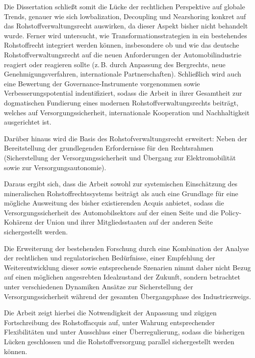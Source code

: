 \documentclass[12pt,a4paper,oneside]{book} %
\begin{document}
Die Dissertation schließt somit die Lücke der rechtlichen Perspektive auf globale Trends, genauer wie sich lowbalization, Decoupling und Nearshoring konkret auf das Rohstoffverwaltungsrecht auswirken, da dieser Aspekt bisher nicht behandelt wurde. Ferner wird untersucht, wie Transformationsstrategien in ein bestehendes Rohstoffrecht integriert werden können, insbesondere ob und wie das deutsche Rohstoffverwaltungsrecht auf die neuen Anforderungen der Automobilindustrie reagiert oder reagieren sollte (z. B. durch Anpassung des Bergrechts, neue Genehmigungsverfahren, internationale Partnerschaften). Schließlich wird auch eine Bewertung der Governance-Instrumente vorgenommen sowie Verbesserungspotential indentifiziert, sodass die Arbeit in ihrer Gesamtheit zur dogmatischen Fundierung eines modernen Rohstoffverwaltungsrechts beiträgt, welches auf Versorgungssicherheit, internationale Kooperation und Nachhaltigkeit ausgerichtet ist.

Darüber hinaus wird die Basis des Rohstofverwaltungsrecht erweitert: Neben der Bereitstellung der grundlegenden Erfordernisse für den Rechtsrahmen (Sicherstellung der Versorgungssicherheit und Übergang zur Elektromobilität sowie zur Versorgungsautonomie).

Daraus ergibt sich, dass die Arbeit sowohl zur systemischen Einschätzung des mineralischen Rohstoffrechtssystems beiträgt als auch eine Grundlage für eine mögliche Ausweitung des bisher existierenden Acquis anbietet, sodass die Versorgungssicherheit des Automobilsektors auf der einen Seite und die Policy-Kohärenz der Union und ihrer Mitgliedsstaaten auf der anderen Seite sichergestellt werden.

Die Erweiterung der bestehenden Forschung durch eine Kombination der Analyse der rechtlichen und regulatorischen Bedürfnisse, einer Empfehlung der Weiterentwicklung dieser sowie entsprechende Szenarien nimmt daher nicht Bezug auf einen möglichen angesrebten Idealzustand der Zukunft, sondern betrachtet unter verschiedenen Dynamiken Ansätze zur Sicherstellung der Versorgungssicherheit während der gesamten Übergangsphase des Industriezweigs.

Die Arbeit zeigt hierbei die Notwendigkeit der Anpassung und zügigen Fortschreibung des Rohstoffacquis auf, unter Wahrung entsprechender Flexibilitäten und unter Ausschluss einer \glqq Überregulierung\grqq, sodass die bisherigen Lücken geschlossen und die Rohstoffversorgung parallel sichergestellt werden können. 
\end{document}
